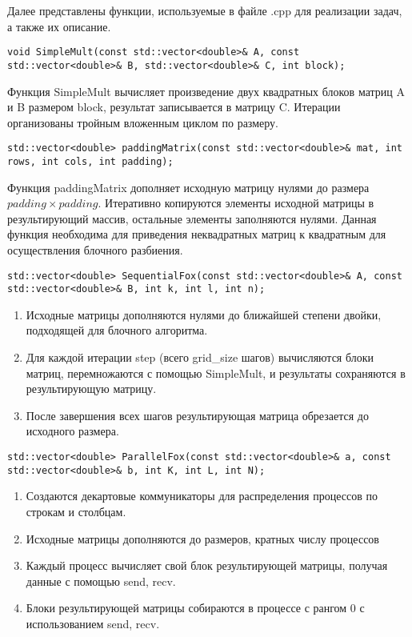 \documentclass{report}
\begin{document}
Далее представлены функции, используемые в файле .cpp для реализации задач, а также их описание.
\begin{lstlisting}
void SimpleMult(const std::vector<double>& A, const std::vector<double>& B, std::vector<double>& C, int block);
\end{lstlisting}
\par Функция SimpleMult вычисляет произведение двух квадратных блоков матриц A и B размером block, результат записывается в матрицу C. Итерации организованы тройным вложенным циклом по размеру.
\begin{lstlisting}
std::vector<double> paddingMatrix(const std::vector<double>& mat, int rows, int cols, int padding);
\end{lstlisting}
\par Функция paddingMatrix дополняет исходную матрицу нулями до размера \(padding \times padding\). Итеративно копируются элементы исходной матрицы в результирующий массив, остальные элементы заполняются нулями. Данная функция необходима для приведения неквадратных матриц к квадратным для осуществления блочного разбиения.
\begin{lstlisting}
std::vector<double> SequentialFox(const std::vector<double>& A, const std::vector<double>& B, int k, int l, int n);
\end{lstlisting}
\begin{enumerate}
    \item Исходные матрицы дополняются нулями до ближайшей степени двойки, подходящей для блочного алгоритма.
    \item Для каждой итерации step (всего grid\_size шагов) вычисляются блоки матриц, перемножаются с помощью SimpleMult, и результаты сохраняются в результирующую матрицу.
    \item После завершения всех шагов результирующая матрица обрезается до исходного размера.
\end{enumerate}
\begin{lstlisting}
std::vector<double> ParallelFox(const std::vector<double>& a, const std::vector<double>& b, int K, int L, int N);
\end{lstlisting}
\begin{enumerate}
    \item Создаются декартовые коммуникаторы для распределения процессов по строкам и столбцам.
    \item Исходные матрицы дополняются до размеров, кратных числу процессов
    \item Каждый процесс вычисляет свой блок результирующей матрицы, получая данные с помощью send, recv.
    \item Блоки результирующей матрицы собираются в процессе с рангом 0 с использованием send, recv.
\end{enumerate}
\end{document}
